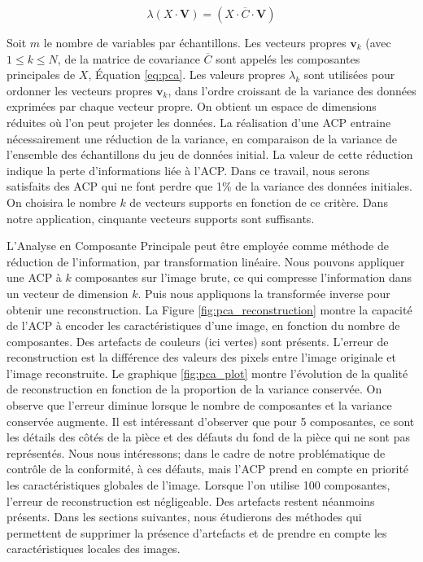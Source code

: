 \begin{equation} \label{eq:pca}
\lambda\left(X \cdot \mathbf{V}\right)=\left(X \cdot \overline{C} \cdot \mathbf{V}\right)
\end{equation}

Soit $m$ le nombre de variables par échantillons. Les vecteurs propres $\mathbf{v}_k$ (avec $1 \leq k \leq N$, de la matrice de covariance $\overline{C}$ sont appelés les composantes principales de $X$, Équation \ref{eq:pca}.
Les valeurs propres $\lambda_k$ sont utilisées pour ordonner les vecteurs propres $\mathbf{v}_k$, dans l'ordre croissant de la variance des données exprimées par chaque vecteur propre.
On obtient un espace de dimensions réduites où l'on peut projeter les données.
La réalisation d'une ACP entraine nécessairement une réduction de la variance, en comparaison de la variance de l'ensemble des échantillons du jeu de données initial.
La valeur de cette réduction indique la perte d'informations liée à l'ACP.
Dans ce travail, nous serons satisfaits des ACP qui ne font perdre que 1\% de la variance des données initiales.
On choisira le nombre $k$ de vecteurs supports en fonction de ce critère.
Dans notre application, cinquante vecteurs supports sont suffisants. 

L'Analyse en Composante Principale peut être employée comme méthode de réduction de l'information, par transformation linéaire.
Nous pouvons appliquer une ACP à $k$ composantes sur l'image brute, ce qui compresse l'information dans un vecteur de dimension $k$.
Puis nous appliquons la transformée inverse pour obtenir une reconstruction.
La Figure \ref{fig:pca_reconstruction} montre la capacité de l'ACP à encoder les caractéristiques d'une image, en fonction du nombre de composantes.
Des artefacts de couleurs (ici vertes) sont présents.
L'erreur de reconstruction est la différence des valeurs des pixels entre l'image originale et l'image reconstruite.
Le graphique \ref{fig:pca_plot} montre l'évolution de la qualité de reconstruction en fonction de la proportion de la variance conservée.
On observe que l'erreur diminue lorsque le nombre de composantes et la variance conservée augmente.
Il est intéressant d'observer que pour 5 composantes, ce sont les détails des côtés de la pièce et des défauts du fond de la pièce qui ne sont pas représentés.
Nous nous intéressons; dans le cadre de notre problématique de contrôle de la conformité, à ces défauts, mais l'ACP prend en compte en priorité les caractéristiques globales de l'image.
Lorsque l'on utilise 100 composantes, l'erreur de reconstruction est négligeable.
Des artefacts restent néanmoins présents.
Dans les sections suivantes, nous étudierons des méthodes qui permettent de supprimer la présence d'artefacts et de prendre en compte les caractéristiques locales des images.

